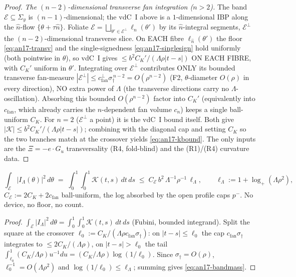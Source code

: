 \begin{proof}
\emph{The $(n-2)$-dimensional transverse fan integration ($n>2$).} The band
$\mathcal E\subseteq\Sigma_y$ is $(n-1)$-dimensional; the vdC~I above is a
$1$-dimensional IBP along the $\hat n$-flow $\{\theta+\tau\hat n\}$. Foliate
$\mathcal E=\bigsqcup_{\theta'\in\mathcal E^\perp}\ell_{\hat n}(\theta')$ by its
$\hat n$-integral segments, $\mathcal E^\perp$ the $(n-2)$-dimensional transverse
slice. On EACH fibre $\ell_{\hat n}(\theta')$ the floor \eqref{eq:an17-transv} and
the single-signedness \eqref{eq:an17-singlesign} hold uniformly (both pointwise in
$\theta$), so vdC~I gives $\le b^2 C_K'/(\Lambda\rho|t-s|)$ ON EACH FIBRE, with
$C_K'$ uniform in $\theta'$. Integrating over $\mathcal E^\perp$ contributes ONLY
its bounded transverse fan-measure $|\mathcal E^\perp|\le c_{\mathrm{fan}}^\perp
\sigma_\dagger^{\,n-2}=O(\rho^{n-2})$ (F2, $\theta$-diameter $O(\rho)$ in every
direction), NO extra power of $\Lambda$ (the transverse directions carry no
$\Lambda$-oscillation). Absorbing this bounded $O(\rho^{n-2})$ factor into $C_K'$
(equivalently into $c_{\mathrm{fan}}$, which already carries the $n$-dependent fan
volume $c_n$) keeps a single ball-uniform $C_K$. For $n=2$ ($\mathcal E^\perp$ a
point) it is the vdC~I bound itself. Both give $|\mathcal K|\le b^2 C_K'/(\Lambda
\rho|t-s|)$; combining with the diagonal cap and setting $C_K$ so the two branches
match at the crossover yields \eqref{eq:an17-kbound}. The only inputs are the
$\Xi=-e\cdot G_u$ transversality (R4, fold-blind) and the (R1)/(R4)
curvature data.
\end{proof}

\begin{lemma}
\label{an17:lem-band}
\begin{equation}\label{eq:an17-bandmass}
 \int_{\mathcal E}|I_\Lambda(\theta)|^2\,d\theta
 \;=\;\int_0^1\!\!\int_0^1\mathcal K(t,s)\,dt\,ds
 \;\le\;C_{\mathcal E}\,b^2\,\Lambda^{-1}\rho^{-1}\,\ell_\Lambda,\qquad
 \ell_\Lambda:=1+\log_+(\Lambda\rho^2),
\end{equation}
$C_{\mathcal E}:=2C_K+2c_{\mathrm{fan}}$ ball-uniform, the log absorbed by the open
profile caps $p^-$. No device, no floor, no count.
\end{lemma}
\begin{proof}
$\int_{\mathcal E}|I_\Lambda|^2\,d\theta=\int_0^1\int_0^1\mathcal K(t,s)\,dt\,ds$
(Fubini, bounded integrand). Split the square at the crossover $\ell_0:=C_K/
(\Lambda\rho c_{\mathrm{fan}}\sigma_\dagger)$: on $|t-s|\le\ell_0$ the cap
$c_{\mathrm{fan}}\sigma_\dagger$ integrates to $\le2C_K/(\Lambda\rho)$, on
$|t-s|>\ell_0$ the tail $\int_{\ell_0}^1(C_K/\Lambda\rho)u^{-1}du=(C_K/\Lambda\rho)
\log(1/\ell_0)$. Since $\sigma_\dagger=O(\rho)$, $\ell_0^{-1}=O(\Lambda\rho^2)$ and
$\log(1/\ell_0)\le\ell_\Lambda$; summing gives \eqref{eq:an17-bandmass}.
\end{proof}

